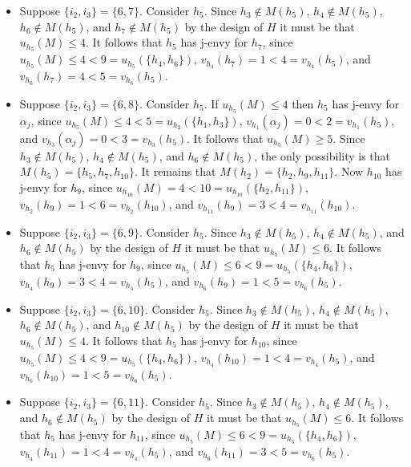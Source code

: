\begin{itemize}
\begin{itemize}
    \item Suppose $\{ i_2, i_3 \} = \{ 6, 7 \}$. Consider $h_5$. Since $h_3 \notin M(h_5)$, $h_4 \notin M(h_5)$, $h_6 \notin M(h_5)$, and $h_7 \notin M(h_5)$ by the design of $H$ it must be that $u_{h_5}(M) \leq 4$. It follows that $h_5$ has j-envy for $h_7$, since $u_{h_5}(M) \leq 4 < 9 = u_{h_5}(\{ h_4, h_6 \})$, $v_{h_4}(h_7) = 1 < 4 = v_{h_4}(h_5)$, and $v_{h_6}(h_7) = 4 < 5 = v_{h_6}(h_5)$.
    \item Suppose $\{ i_2, i_3 \} = \{ 6, 8 \}$. Consider $h_5$. If $u_{h_5}(M) \leq 4$ then $h_5$ has j-envy for $\alpha_{j}$, since $u_{h_5}(M) \leq 4 < 5 = u_{h_2}(\{ h_1, h_3 \})$, $v_{h_1}(\alpha_{j}) = 0 < 2 = v_{h_1}(h_5)$, and $v_{h_3}(\alpha_{j}) = 0 < 3 = v_{h_3}(h_5)$. It follows that $u_{h_5}(M) \geq 5$. Since $h_3 \notin M(h_5)$, $h_4 \notin M(h_5)$, and $h_6 \notin M(h_5)$, the only possibility is that $M(h_5) = \{ h_5, h_7, h_{10} \}$. It remains that $M(h_2) = \{ h_2, h_9, h_{11} \}$. Now $h_{10}$ has j-envy for $h_9$, since $u_{h_{10}}(M) = 4 < 10 = u_{h_{10}}(\{ h_2, h_{11} \})$, $v_{h_2}(h_9) = 1 < 6 = v_{h_2}(h_{10})$, and $v_{h_{11}}(h_9) = 3 < 4 = v_{h_{11}}(h_{10})$. 
    \item Suppose $\{ i_2, i_3 \} = \{ 6, 9 \}$. Consider $h_5$. Since $h_3 \notin M(h_5)$, $h_4 \notin M(h_5)$, and $h_6 \notin M(h_5)$ by the design of $H$ it must be that $u_{h_5}(M) \leq 6$. It follows that $h_5$ has j-envy for $h_9$, since $u_{h_5}(M) \leq 6 < 9 = u_{h_5}(\{ h_4, h_6 \})$, $v_{h_4}(h_9) = 3 < 4 = v_{h_4}(h_5)$, and $v_{h_6}(h_9) = 1 < 5 = v_{h_6}(h_5)$.
    \item Suppose $\{ i_2, i_3 \} = \{ 6, 10 \}$. Consider $h_5$. Since $h_3 \notin M(h_5)$, $h_4 \notin M(h_5)$, $h_6 \notin M(h_5)$, and $h_{10} \notin M(h_5)$ by the design of $H$ it must be that $u_{h_5}(M) \leq 4$. It follows that $h_5$ has j-envy for $h_{10}$, since $u_{h_5}(M) \leq 4 < 9 = u_{h_5}(\{ h_4, h_6 \})$, $v_{h_4}(h_{10}) = 1 < 4 = v_{h_4}(h_5)$, and $v_{h_6}(h_{10}) = 1 < 5 = v_{h_6}(h_5)$.
    \item Suppose $\{ i_2, i_3 \} = \{ 6, 11 \}$. Consider $h_5$. Since $h_3 \notin M(h_5)$, $h_4 \notin M(h_5)$, and $h_6 \notin M(h_5)$ by the design of $H$ it must be that $u_{h_5}(M) \leq 6$. It follows that $h_5$ has j-envy for $h_{11}$, since $u_{h_5}(M) \leq 6 < 9 = u_{h_5}(\{ h_4, h_6 \})$, $v_{h_4}(h_{11}) = 1 < 4 = v_{h_4}(h_5)$, and $v_{h_6}(h_{11}) = 3 < 5 = v_{h_6}(h_5)$.
\end{itemize}
\end{itemize}

